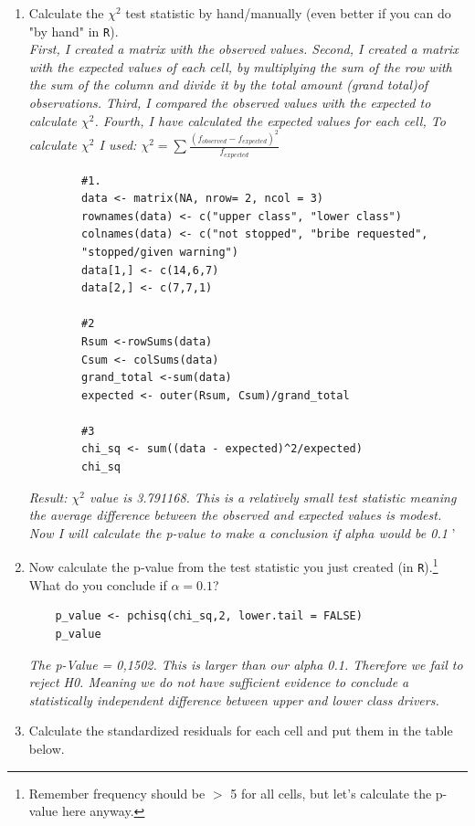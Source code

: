 \documentclass[12pt,letterpaper]{article}
\begin{document}
\begin{enumerate}
	
	\item [(a)]
	Calculate the $\chi^2$ test statistic by hand/manually (even better if you can do "by hand" in \texttt{R}).\\
	
\textit{First,	I created a matrix with the observed values. Second, I created a matrix with the expected values of each cell, by multiplying the sum of the row with the sum of the column and divide it by the total amount (grand total)of observations. Third, I compared the observed values with the expected to calculate $\chi^2$.  Fourth, I have calculated the expected values for each cell,  To calculate $\chi^2$ I used:
	 $\chi^2 = \sum{\frac{(f_{observed}-f_{expected})^2}{f_{expected}}}$}
	\begin{Verbatim}
		#1.  
		data <- matrix(NA, nrow= 2, ncol = 3)
		rownames(data) <- c("upper class", "lower class")
		colnames(data) <- c("not stopped", "bribe requested",
		"stopped/given warning")
		data[1,] <- c(14,6,7)
		data[2,] <- c(7,7,1)
		
		#2
		Rsum <-rowSums(data)
		Csum <- colSums(data)
		grand_total <-sum(data)
		expected <- outer(Rsum, Csum)/grand_total
		
		#3
		chi_sq <- sum((data - expected)^2/expected)
		chi_sq
	\end{Verbatim}
		
\textit{Result:  $\chi^2$ value is 3.791168. This is a relatively small test statistic meaning the average difference between the observed and expected values is modest. Now I will calculate the p-value to make a conclusion if alpha would be 0.1}
	'
	\item [(b)]
	Now calculate the p-value from the test statistic you just created (in \texttt{R}).\footnote{Remember frequency should be $>$ 5 for all cells, but let's calculate the p-value here anyway.}  What do you conclude if $\alpha = 0.1$?\\
	
	\begin{Verbatim}
	p_value <- pchisq(chi_sq,2, lower.tail = FALSE)
	p_value
\end{Verbatim}


\textit{The p-Value = 0,1502. This is larger than our alpha 0.1. Therefore we fail to reject H0. Meaning we do not have sufficient evidence to conclude a statistically independent difference between upper and lower class drivers.}
	
	\item [(c)] Calculate the standardized residuals for each cell and put them in the table below.
	\vspace{1cm}
	

\end{enumerate}
\end{document}
